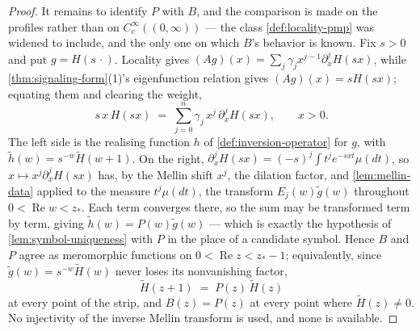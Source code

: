 \begin{proof}
It remains to identify $P$ with $B$, and the comparison is made on the profiles rather than on
$C_c^\infty((0,\infty))$ --- the class \ref{def:locality-pmp} was widened to include, and the only
one on which $B$'s behavior is known. Fix $s > 0$ and put $g = H(s\,\cdot)$. Locality gives
$(Ag)(x) = \sum_j \gamma_j x^{j-1}\partial_x^j H(sx)$, while \ref{thm:signaling-form}(1)'s
eigenfunction relation gives $(Ag)(x) = sH(sx)$; equating them and clearing the weight,
\[
  s\,x\,H(sx) \;=\; \sum_{j=0}^{n} \gamma_j\, x^{j}\,\partial_x^{j} H(sx),
  \qquad x > 0 .
\]
The left side is the realising function $h$ of \ref{def:inversion-operator} for $g$, with
$\tilde h(w) = s^{-w}\tilde H(w+1)$. On the right, $\partial_x^j H(sx) = (-s)^j\int t^j
e^{-sxt}\mu(dt)$, so $x \mapsto x^j\partial_x^j H(sx)$ has, by the Mellin shift $x^j$, the
dilation factor, and \ref{lem:mellin-data} applied to the measure $t^j\mu(dt)$, the transform
$E_j(w)\tilde g(w)$ throughout $0 < \operatorname{Re} w < z_*$. Each term converges there, so the
sum may be transformed term by term, giving $\tilde h(w) = P(w)\tilde g(w)$ --- which is exactly
the hypothesis of \ref{lem:symbol-uniqueness} with $P$ in the place of a candidate symbol. Hence
$B$ and $P$ agree as meromorphic functions on $0 < \operatorname{Re} z < z_*-1$; equivalently,
since $\tilde g(w) = s^{-w}\tilde H(w)$ never loses its nonvanishing factor,
\[
  \tilde H(z+1) \;=\; P(z)\,\tilde H(z)
\]
at every point of the strip, and $B(z) = P(z)$ at every point where $\tilde H(z) \ne 0$.
No injectivity of the inverse Mellin transform is used, and none is available.
\end{proof}

